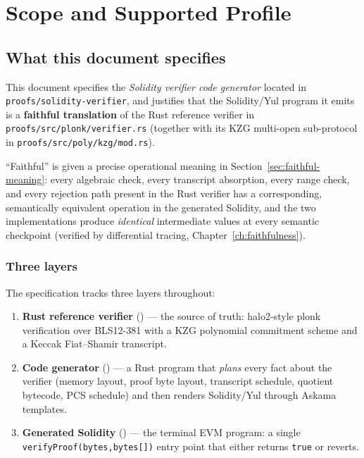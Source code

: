 \chapter{Scope and Supported Profile}
\label{ch:scope}

\section{What this document specifies}
\label{sec:what}

This document specifies the \emph{Solidity verifier code generator} located in
\texttt{proofs/\allowbreak{}solidity-verifier}, and justifies that the Solidity/\allowbreak{}Yul program it
emits is a \textbf{faithful translation} of the Rust reference verifier in
\texttt{proofs/\allowbreak{}src/\allowbreak{}plonk/\allowbreak{}verifier.rs} (together with its KZG multi-open
sub-protocol in \texttt{proofs/\allowbreak{}src/\allowbreak{}poly/\allowbreak{}kzg/\allowbreak{}mod.rs}).

``Faithful'' is given a precise operational meaning in
Section~\ref{sec:faithful-meaning}: every algebraic check, every transcript
absorption, every range check, and every rejection path present in the Rust
verifier has a corresponding, semantically equivalent operation in the
generated Solidity, and the two implementations produce \emph{identical}
intermediate values at every semantic checkpoint (verified by differential
tracing, Chapter~\ref{ch:faithfulness}).

\subsection*{Three layers}
The specification tracks three layers throughout:
\begin{enumerate}[leftmargin=1.4em,itemsep=2pt]
  \item \textbf{Rust reference verifier} () --- the
        source of truth: halo2-style plonk verification over BLS12-381 with a
        KZG polynomial commitment scheme and a Keccak Fiat--Shamir transcript.
  \item \textbf{Code generator} () ---
        a Rust program that \emph{plans} every fact about the verifier
        (memory layout, proof byte layout, transcript schedule, quotient
        bytecode, PCS schedule) and then renders Solidity/\allowbreak{}Yul through Askama
        templates.
  \item \textbf{Generated Solidity} () --- the
        terminal EVM program: a single \texttt{verifyProof(bytes,bytes[])}
        entry point that either returns \texttt{true} or reverts.
\end{enumerate}

